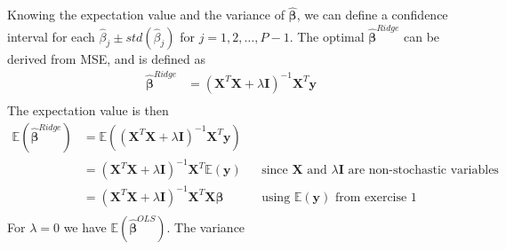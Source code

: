 Knowing the expectation value and the variance of $\boldsymbol{\hat{\beta}}$, we can define a confidence interval for each $\hat{\beta}_{j} \pm std(\hat{\beta}_j)$ for $j=1, 2, \hdots, P-1$.
%
The optimal $\boldsymbol{\hat{\beta}}^{Ridge}$ can be derived from MSE, and is defined as 
\begin{align*}
    \boldsymbol{\hat{\beta}}^{Ridge} &= (\boldsymbol{X}^{T}\boldsymbol{X} + \lambda \boldsymbol{I})^{-1} \boldsymbol{X}^{T} \boldsymbol{y} \\
\end{align*}
The expectation value is then 
\begin{align*}
    \mathbb{E} (\boldsymbol{\hat{\beta}}^{Ridge}) &= \mathbb{E}((\boldsymbol{X}^{T}\boldsymbol{X} + \lambda \boldsymbol{I})^{-1} \boldsymbol{X}^{T} \boldsymbol{y}) \\
    &= (\boldsymbol{X}^{T}\boldsymbol{X} + \lambda \boldsymbol{I})^{-1} \boldsymbol{X}^{T} \mathbb{E}( \boldsymbol{y} ) && \text{since $\boldsymbol{X}$ and $\lambda \boldsymbol{I}$ are non-stochastic variables} \\
    &= (\boldsymbol{X}^{T}\boldsymbol{X} + \lambda \boldsymbol{I})^{-1} \boldsymbol{X}^{T} \boldsymbol{X} \boldsymbol{\beta} && \text{using $\mathbb{E} (\boldsymbol{y})$ from exercise 1} \\
\end{align*}
For $\lambda = 0$ we have $\mathbb{E} (\boldsymbol{\hat{\beta}}^{OLS})$. The variance 
